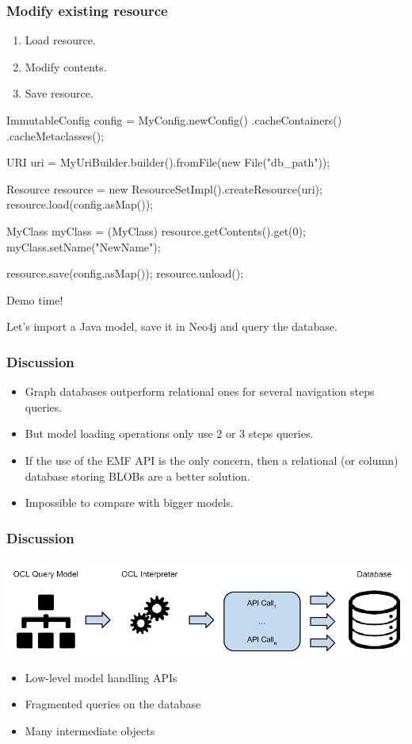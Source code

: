 \documentclass[10pt]{beamer}
\begin{document}
\begin{frame}[fragile]\frametitle{Modify existing resource}
	\begin{enumerate}
	\item Load resource.
	\item Modify contents.
	\item Save resource. 
	\end{enumerate}
	
  \begin{java}
    ImmutableConfig config = MyConfig.newConfig()
    .cacheContainers()
    .cacheMetaclasses();

    URI uri = MyUriBuilder.builder().fromFile(new File("db_path"));

    Resource resource = new ResourceSetImpl().createResource(uri);
    resource.load(config.asMap());

    MyClass myClass = (MyClass) resource.getContents().get(0);
    myClass.setName("NewName");

    resource.save(config.asMap());
    resource.unload();
  \end{java}
\end{frame}

\begin{frame}[standout]
  Demo time!

  Let's import a Java model, save it in Neo4j and query the database.
\end{frame}

\begin{frame}[c]\frametitle{Discussion}
	\begin{itemize}
	\item Graph databases outperform relational ones for several navigation steps queries.
	\item But model loading operations only use 2 or 3 steps queries.
	\item If the use of the EMF API is the only concern, then a relational (or column) database storing BLOBs are a better solution.
	\item Impossible to compare with bigger models.
	\end{itemize}
\end{frame}

\begin{frame}[c]\frametitle{Discussion}
  \begin{center}
    \includegraphics[width=\textwidth]{neoemf-discussion.png}
  \end{center}
	\begin{itemize}
	\item Low-level model handling APIs
	\item Fragmented queries on the database
	\item Many intermediate objects
	\end{itemize}
\end{frame}
\end{document}
